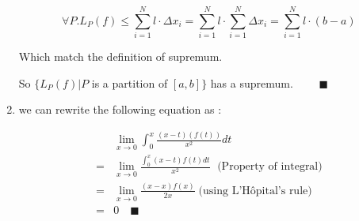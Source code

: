 \documentclass[12pt]{exam}
\begin{document}
\begin{enumerate}
	$$
	\forall P. L_P(f) \leq \sum_{i = 1}^{N}l \cdot \Delta x_i = \sum_{i = 1}^{N}l \cdot \sum_{i = 1}^{N} \Delta x_i = \sum_{i = 1}^{N}l \cdot (b - a)
	$$

	Which match the definition of supremum.

	So $\{L_P(f) | P$ is a partition of $[a, b]\}$ has a supremum. $\qquad \blacksquare$

\item 

we can rewrite the following equation as :

\begin{align*}
	& \lim_{x \to 0} \int_{0}^{x} \frac{(x - t)(f(t))}{x^2} dt \\
	= & \lim_{x \to 0} \frac{\int_{0}^{x} (x - t) f(t) dt}{x^2} \; \mbox{ (Property of integral)} \\
	= & \lim_{x \to 0} \frac{(x - x) f(x)}{2x} \; \mbox{(using L'Hôpital's rule) } \\
	= & 0 \quad \blacksquare
\end{align*}

\end{enumerate}
\end{document}
